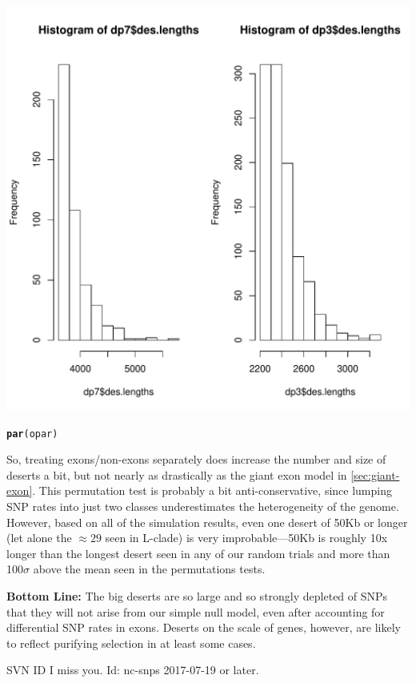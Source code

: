 \documentclass{article}\usepackage[]{graphicx}\usepackage[]{color}
\makeatletter
\def\maxwidth{ %
  \ifdim\Gin@nat@width>\linewidth
    \linewidth
  \else
    \Gin@nat@width
  \fi
}
\newcommand{\hlstd}[1]{\textcolor[rgb]{0.345,0.345,0.345}{#1}}%
\newcommand{\hlkwd}[1]{\textcolor[rgb]{0.737,0.353,0.396}{\textbf{#1}}}%
\newenvironment{kframe}{%
 \def\at@end@of@kframe{}%
 \ifinner\ifhmode%
  \def\at@end@of@kframe{\end{minipage}}%
  \begin{minipage}{\columnwidth}%
 \fi\fi%
 \def\FrameCommand##1{\hskip\@totalleftmargin \hskip-\fboxsep
 \colorbox{shadecolor}{##1}\hskip-\fboxsep
     \hskip-\linewidth \hskip-\@totalleftmargin \hskip\columnwidth}%
 \MakeFramed {\advance\hsize-\width
   \@totalleftmargin\z@ \linewidth\hsize
   \@setminipage}}%
 {\par\unskip\endMakeFramed%
 \at@end@of@kframe}
\newenvironment{knitrout}{}{} %
\makeatother
\begin{document}
\begin{knitrout}
\includegraphics[width=\maxwidth]{figs-knitr/unnamed-chunk-25-1} 
\begin{kframe}\begin{alltt}
\hlkwd{par}\hlstd{(opar)}
\end{alltt}
\end{kframe}
\end{knitrout}

So, treating exons/non-exons separately does increase the number and size of deserts a bit, but not nearly as drastically as the giant exon model in \ref{sec:giant-exon}.  This permutation test is probably a bit anti-conservative, since lumping SNP rates into just two classes underestimates the heterogeneity of the genome.  However, based on all of the simulation results, even one desert of 50Kb or longer (let alone the $\approx29$ seen in L-clade) is very improbable---50Kb is roughly 10x longer than the longest desert seen in any of our random trials and more than 100$\sigma$ above the mean seen in the permutations tests.

\textbf{Bottom Line:}
The big deserts are so large and so strongly depleted of SNPs that they will not arise from our simple null model, even after accounting for differential SNP rates in exons.  Deserts on the scale of genes, however, are likely to reflect purifying selection in at least some cases.

\vfill\footnotesize\flushright SVN ID I miss you. $ $Id: nc-snps 2017-07-19 or later.$ $
\end{document}

